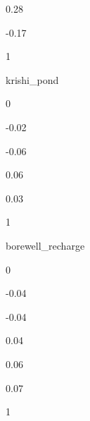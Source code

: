 \documentclass[
]{article}
\begin{document}
{0.28 }

{-0.17}

{1 }

{ }

{ }

{ }

{ }

{ }

{ }

{ }

{ }

{ }

{ }

{ }

{ }

{ }

{ }

{ }

{ }

{ }

{ }

{ }

krishi\_pond

{0 }

{-0.02}

{-0.06}

{0.06 }

{0.03 }

{1 }

{ }

{ }

{ }

{ }

{ }

{ }

{ }

{ }

{ }

{ }

{ }

{ }

{ }

{ }

{ }

{ }

{ }

{ }

borewell\_recharge

{0 }

{-0.04}

{-0.04}

{0.04 }

{0.06 }

{0.07 }

{1 }

{ }

{ }
\end{document}
